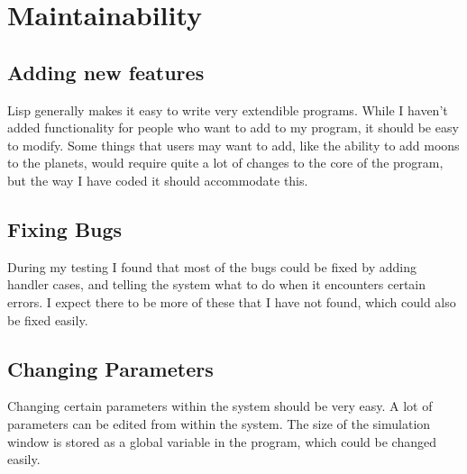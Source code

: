 \section{Maintainability}
\subsection{Adding new features}
Lisp generally makes it easy to write very extendible programs. While I haven't
added functionality for people who want to add to my program, it should be easy
to modify. Some things that users may want to add, like the ability to add moons
to the planets, would require quite a lot of changes to the core of the program,
but the way I have coded it should accommodate this.

\subsection{Fixing Bugs}
During my testing I found that most of the bugs could be fixed by adding handler
cases, and telling the system what to do when it encounters certain errors. I
expect there to be more of these that I have not found, which could also be
fixed easily.

\subsection{Changing Parameters}
Changing certain parameters within the system should be very easy. A lot of
parameters can be edited from within the system. The size of the simulation
window is stored as a global variable in the program, which could be changed
easily.
